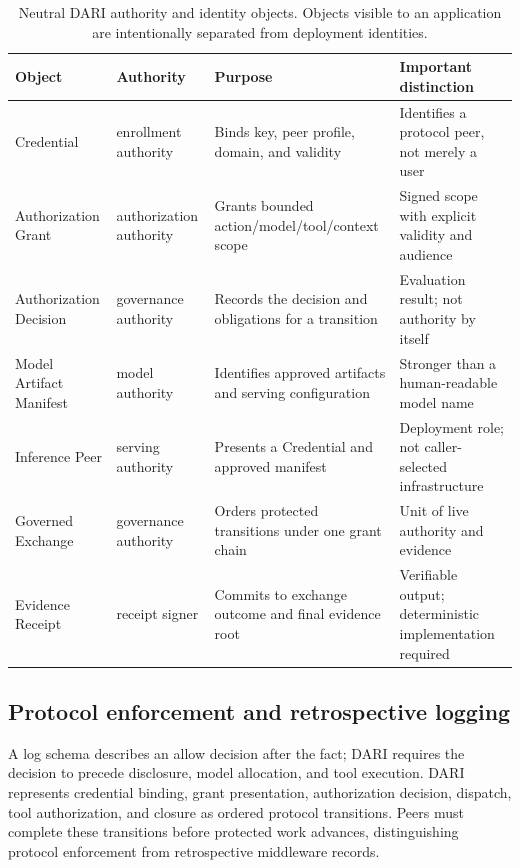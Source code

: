 \documentclass[10pt]{article}
\begin{document}
\begin{table}[t]
\centering
\caption{Neutral DARI authority and identity objects. Objects visible to an application are intentionally separated from deployment identities.}
\label{tab:objects}
\small
\begin{tabularx}{\textwidth}{@{}l l Y Y@{}}
\toprule
Object & Authority & Purpose & Important distinction \\
\midrule
Credential & enrollment authority & Binds key, peer profile, domain, and validity & Identifies a protocol peer, not merely a user \\
Authorization Grant & authorization authority & Grants bounded action/model/tool/context scope & Signed scope with explicit validity and audience \\
Authorization Decision & governance authority & Records the decision and obligations for a transition & Evaluation result; not authority by itself \\
Model Artifact Manifest & model authority & Identifies approved artifacts and serving configuration & Stronger than a human-readable model name \\
Inference Peer & serving authority & Presents a Credential and approved manifest & Deployment role; not caller-selected infrastructure \\
Governed Exchange & governance authority & Orders protected transitions under one grant chain & Unit of live authority and evidence \\
Evidence Receipt & receipt signer & Commits to exchange outcome and final evidence root & Verifiable output; deterministic implementation required \\
\bottomrule
\end{tabularx}
\end{table}

\subsection{Protocol enforcement and retrospective logging}

A log schema describes an allow decision after the fact; DARI requires the decision to precede disclosure, model allocation, and tool execution. DARI represents credential binding, grant presentation, authorization decision, dispatch, tool authorization, and closure as ordered protocol transitions. Peers must complete these transitions before protected work advances, distinguishing protocol enforcement from retrospective middleware records.
\end{document}
